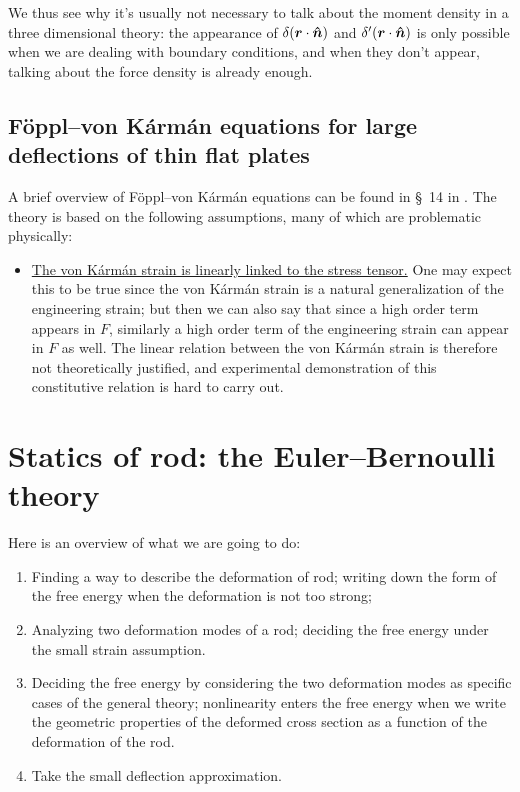 \documentclass[hyperref, a4paper]{article}
\newcommand*{\citesec}[1]{\S~{#1}}
\begin{document}
We thus see why it's usually not necessary to talk about the moment density 
in a three dimensional theory:
the appearance of $\delta(\vb*{r} \cdot \vu*{n})$ and $\delta'(\vb*{r} \cdot \vu*{n})$
is only possible when we are dealing with boundary conditions,
and when they don't appear, 
talking about the force density is already enough.

\subsection{Föppl–von Kármán equations for  large deflections of thin flat plates}

A brief overview of Föppl–von Kármán equations can be found 
in \citesec{14} in \cite{landau1986theory}.
The theory is based on the following assumptions,
many of which are problematic physically:
\begin{itemize}
    \item \ul{The von Kármán strain is linearly linked to the stress tensor.}
    One may expect this to be true since 
    the von Kármán strain is a natural generalization 
    of the engineering strain;
    but then we can also say that 
    since a high order term appears in $F$,
    similarly a high order term of the engineering strain can appear in $F$ as well.
    The linear relation between the von Kármán strain 
    is therefore not theoretically justified,
    and experimental demonstration of this constitutive relation 
    is hard to carry out.
\end{itemize}

\section{Statics of rod: the Euler–Bernoulli theory}

Here is an overview of what we are going to do:
\begin{enumerate}
    \item Finding a way to describe the deformation of rod; 
        writing down the form of the free energy 
        when the deformation is not too strong; 
    \item Analyzing two deformation modes of a rod; 
        deciding the free energy 
        under the small strain assumption.
    \item Deciding the free energy
        by considering the two deformation modes 
        as specific cases of the general theory; 
        nonlinearity enters the free energy 
        when we write the geometric properties of the deformed cross section 
        as a function of the deformation of the rod.
    \item Take the small deflection approximation.
\end{enumerate}
\end{document}
